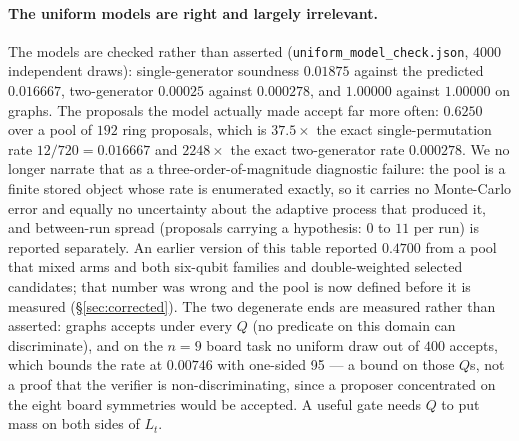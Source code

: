 \documentclass{neurips_2024}
\begin{document}
\paragraph{The uniform models are right and largely irrelevant.} The models are checked rather than
asserted (\texttt{uniform\_model\_check.json}, $4000$ independent draws): single-generator soundness
$0.01875$ against the predicted $0.016667$, two-generator $0.00025$ against $0.000278$, and
$1.00000$ against $1.00000$ on graphs. The proposals the model actually made accept far more often:
$0.6250$ over a pool of $192$ ring proposals, which is $37.5\times$ the exact single-permutation
rate $12/720 = 0.016667$ and $2248\times$ the exact two-generator rate $0.000278$. We no longer
narrate that as a three-order-of-magnitude diagnostic failure: the pool is a finite stored object
whose rate is enumerated exactly, so it carries no Monte-Carlo error and equally no uncertainty
about the adaptive process that produced it, and between-run spread (proposals carrying a
hypothesis: $0$ to $11$ per run) is reported separately. An earlier version of this table reported
$0.4700$ from a pool that mixed arms and both six-qubit families and double-weighted selected
candidates; that number was wrong and the pool is now defined before it is measured
(\S\ref{sec:corrected}). The two degenerate ends are measured rather than asserted: graphs accepts
under every $Q$ (no predicate on this domain can discriminate), and on the $n=9$ board task no
uniform draw out of $400$ accepts, which bounds the rate at $0.00746$ with one-sided 95%
--- a bound on those $Q$s, not a proof that the verifier is non-discriminating, since a proposer
concentrated on the eight board symmetries would be accepted. A useful gate needs $Q$ to put mass on
both sides of $L_t$.
\end{document}
